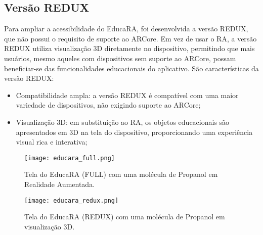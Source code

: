 \documentclass[12pt]{article}
\begin{document}

\subsection{Versão REDUX}

Para ampliar a acessibilidade do EducaRA, foi desenvolvida a versão REDUX, que não possui o requisito de suporte ao ARCore. Em vez de usar o RA, a versão REDUX utiliza visualização 3D diretamente no dispositivo, permitindo que mais usuários, mesmo aqueles com dispositivos sem suporte ao ARCore, possam beneficiar-se das funcionalidades educacionais do aplicativo. São características da versão REDUX:

\begin{itemize}
    \item Compatibilidade ampla: a versão REDUX é compatível com uma maior variedade de dispositivos, não exigindo suporte ao ARCore;
    \item Visualização 3D: em substituição ao RA, os objetos educacionais são apresentados em 3D na tela do dispositivo, proporcionando uma experiência visual rica e interativa;
\end{itemize}


\begin{figure}[H]
  \centering
  \begin{minipage}{0.45\textwidth}
    \centering
    \texttt{[image: educara\_full.png]}
    \caption{Tela do EducaRA (FULL) com uma molécula de Propanol em Realidade Aumentada.}
    \label{fig:educara_full}
  \end{minipage}
  \hfill
  \begin{minipage}{0.45\textwidth}
    \centering
    \texttt{[image: educara\_redux.png]}
    \caption{Tela do EducaRA (REDUX) com uma molécula de Propanol em visualização 3D.}
    \label{fig:educara_redux}
  \end{minipage}
\end{figure}
\end{document}
